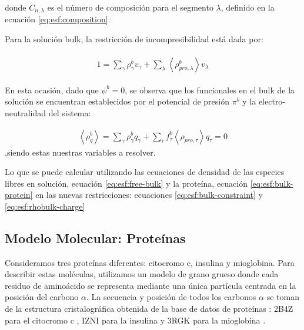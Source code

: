 donde $C_{n,\lambda}$ es el n\'umero de composici\'on para el segmento $\lambda$, definido en la ecuaci\'on  \ref{eq:esf:composition}.

Para la soluci\'on bulk, la restricci\'on de incompresibilidad est\'a dada por:

\begin{align}
	\begin{aligned}
		1= {\sum_{\gamma}\rho^b_\gamma v_\gamma + \sum_\lambda{\left<\rho^b_{pro,\lambda}\right>v_\lambda} }
	\end{aligned}
	\label{eq:esf:bulk-constraint}
\end{align}


En esta ocasi\'on, dado que $\psi^b = 0$, se observa que los funcionales en el bulk de la soluci\'on se encuentran establecidos por el potencial de presi\'on $\pi^b$ y la electro-neutralidad del sistema:

\begin{align}
	\left<\rho^b_q\right> = \sum_{\gamma } {\rho^b_\gamma q_\gamma + \sum_\tau{f^b_\tau \left<\rho_{pro,\tau}\right> q_\tau} =0}
	\label{eq:esf:rhobulk-charge}
\end{align}  
,siendo estas nuestras variables a resolver.

Lo que se puede calcular utilizando las ecuaciones de densidad de las especies libres en soluci\'on, ecuaci\'on  \ref{eq:esf:free-bulk} y la prote\'ina, ecuaci\'on \ref{eq:esf:bulk-protein} en las nuevas restricciones: ecuaciones  \ref{eq:esf:bulk-constraint} y \ref{eq:esf:rhobulk-charge}



\subsection{Modelo Molecular: Prote\'inas}\label{subsec:protein}



Consideramos tres prote\'inas diferentes: citocromo c, insulina y mioglobina.
Para describir estas mol\'eculas, utilizamos un modelo de grano grueso donde cada residuo de amino\'acido se representa mediante una \'unica part\'icula centrada en la posici\'on del carbono $\alpha$.
La secuencia y posici\'on de todos los carbonos $\alpha$ se toman de la estructura cristalogr\'afica obtenida de la base de datos de prote\'inas \cite{berman2000protein}: 2B4Z para el citocromo c \cite{mirkin2008high}, IZNI para la insulina \cite{bentley1976structure} y 3RGK para la mioglobina \cite{hubbard1990x}.

